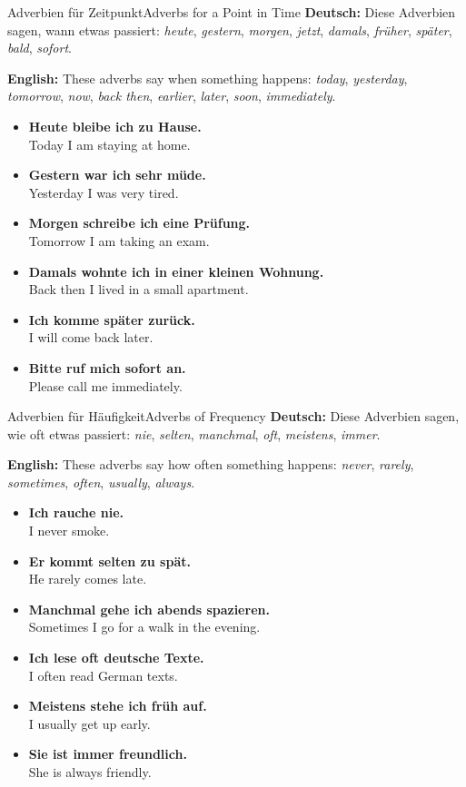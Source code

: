 \documentclass[a4paper,11pt]{article}
\newcommand{\GermanText}[1]{\textbf{Deutsch: }#1\par}
\newcommand{\EnglishText}[1]{{\color{SoftGray}\textbf{English: }#1\par}}
\newcommand{\ExampleItem}[2]{\item \textbf{#1}\\{\color{SoftGray}#2}}
\begin{document}
\begin{grammarentry}{Adverbien für Zeitpunkt}{Adverbs for a Point in Time}
    \GermanText{Diese Adverbien sagen, wann etwas passiert: \textit{heute}, \textit{gestern}, \textit{morgen}, \textit{jetzt}, \textit{damals}, \textit{früher}, \textit{später}, \textit{bald}, \textit{sofort}.}
    \EnglishText{These adverbs say when something happens: \textit{today}, \textit{yesterday}, \textit{tomorrow}, \textit{now}, \textit{back then}, \textit{earlier}, \textit{later}, \textit{soon}, \textit{immediately}.}
    \begin{exbox}
        \begin{itemize}
            \ExampleItem{Heute bleibe ich zu Hause.}{Today I am staying at home.}
            \ExampleItem{Gestern war ich sehr müde.}{Yesterday I was very tired.}
            \ExampleItem{Morgen schreibe ich eine Prüfung.}{Tomorrow I am taking an exam.}
            \ExampleItem{Damals wohnte ich in einer kleinen Wohnung.}{Back then I lived in a small apartment.}
            \ExampleItem{Ich komme später zurück.}{I will come back later.}
            \ExampleItem{Bitte ruf mich sofort an.}{Please call me immediately.}
        \end{itemize}
    \end{exbox}
\end{grammarentry}

\begin{grammarentry}{Adverbien für Häufigkeit}{Adverbs of Frequency}
    \GermanText{Diese Adverbien sagen, wie oft etwas passiert: \textit{nie}, \textit{selten}, \textit{manchmal}, \textit{oft}, \textit{meistens}, \textit{immer}.}
    \EnglishText{These adverbs say how often something happens: \textit{never}, \textit{rarely}, \textit{sometimes}, \textit{often}, \textit{usually}, \textit{always}.}
    \begin{exbox}
        \begin{itemize}
            \ExampleItem{Ich rauche nie.}{I never smoke.}
            \ExampleItem{Er kommt selten zu spät.}{He rarely comes late.}
            \ExampleItem{Manchmal gehe ich abends spazieren.}{Sometimes I go for a walk in the evening.}
            \ExampleItem{Ich lese oft deutsche Texte.}{I often read German texts.}
            \ExampleItem{Meistens stehe ich früh auf.}{I usually get up early.}
            \ExampleItem{Sie ist immer freundlich.}{She is always friendly.}
        \end{itemize}
    \end{exbox}
\end{grammarentry}
\end{document}
